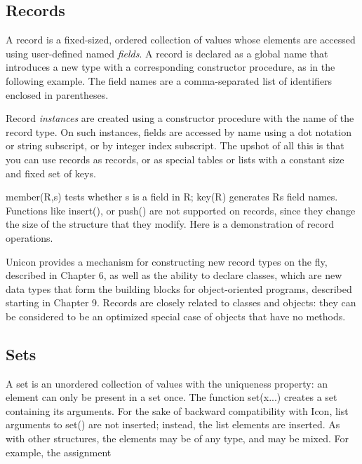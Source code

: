\subsection{Records}

A record is a fixed-sized, ordered collection of values
whose elements are accessed using user-defined named \textit{fields}. A
record is declared as a global name that introduces a new type with a
corresponding constructor procedure, as in
the following example. The field names are a comma-separated list of
identifiers enclosed in parentheses.


Record \textit{instances} are created using a
constructor procedure with the name of the record type. On such
instances, fields are accessed by name using a dot notation or string
subscript, or by integer index subscript. The upshot of all this is
that you can use records as records, or as special tables or lists with
a constant size and fixed set of keys.

\textsf{member(R,s)} tests whether \textsf{s} is a field in \textsf{R};
\textsf{key(R)} generates \textsf{R}{\textquotesingle}s field names.
Functions like \textsf{insert()}, or \textsf{push()} are not supported
on records, since they change the size of the structure that they
modify. Here is a demonstration of record operations.


Unicon provides a mechanism for constructing new record types on the
fly, described in Chapter 6, as well as the ability to declare classes,
which are new data types that form the building blocks for
object-oriented programs, described starting in Chapter 9. Records are
closely related to classes and objects: they can be considered to be an
optimized special case of objects that have no methods. \ 

\subsection{Sets}

A set is an unordered collection of values with the
uniqueness property: an element can only be present in a set once. The
function \textsf{set(x...)} creates a set containing its arguments. For
the sake of backward compatibility with Icon, list arguments to
\textsf{set()} are not inserted; instead, the list elements are
inserted. As with other structures, the elements may be of any type,
and may be mixed. For example, the assignment

